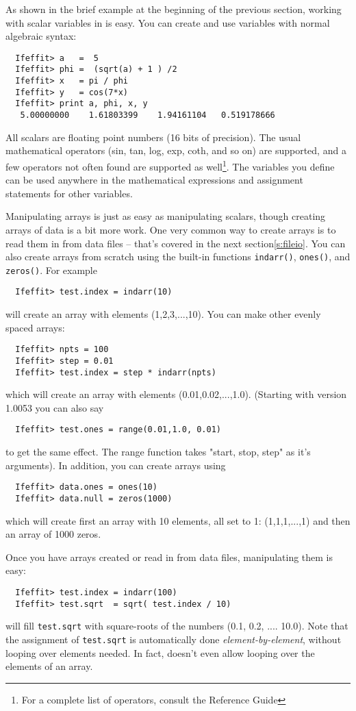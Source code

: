 \documentclass[11pt]{article}
\begin{document}
As shown in the brief example at the beginning of the previous section,
working with scalar variables in {\ifeffit} is easy.  You can create and
use variables with normal algebraic syntax:
{\small\begin{verbatim}
  Ifeffit> a   =  5
  Ifeffit> phi =  (sqrt(a) + 1 ) /2
  Ifeffit> x   = pi / phi
  Ifeffit> y   = cos(7*x)
  Ifeffit> print a, phi, x, y
   5.00000000    1.61803399    1.94161104   0.519178666      
\end{verbatim}}\noindent
All scalars are floating point numbers (16 bits of precision).  The usual
mathematical operators (sin, tan, log, exp, coth, and so on) are supported,
and a few operators not often found are supported as well{\footnote{For a
    complete list of operators, consult the Reference Guide}}. The
variables you define can be used anywhere in the mathematical expressions
and assignment statements for other variables.

Manipulating arrays is just as easy as manipulating scalars, though
creating arrays of data is a bit more work.  One very common way to create
arrays is to read them in from data files -- that's covered in the next
section\ref{s:fileio}.  You can also create arrays from scratch using the
built-in functions {\tt{indarr()}}, {\tt{ones()}}, and {\tt{zeros()}}.  For
example
{\small\begin{verbatim}
  Ifeffit> test.index = indarr(10)
\end{verbatim}}\noindent
will create an array with elements (1,2,3,...,10).   You can 
make other evenly spaced arrays:
{\small\begin{verbatim}
  Ifeffit> npts = 100
  Ifeffit> step = 0.01
  Ifeffit> test.index = step * indarr(npts)
\end{verbatim}}\noindent
which will create an array with elements (0.01,0.02,...,1.0). 
(Starting with version 1.0053 you can also say
{\small\begin{verbatim}
  Ifeffit> test.ones = range(0.01,1.0, 0.01)
\end{verbatim}}\noindent
to get the same effect.  The range function takes "start, stop, step" as
it's arguments).  In addition, you can create arrays using 
{\small\begin{verbatim}
  Ifeffit> data.ones = ones(10)
  Ifeffit> data.null = zeros(1000)
\end{verbatim}}
\noindent
which will create first an array with 10 elements, all set to 1:
(1,1,1,...,1) and then an array of 1000 zeros.

Once you have arrays created or read in from data files, manipulating them
is easy:
{\small\begin{verbatim}
  Ifeffit> test.index = indarr(100)
  Ifeffit> test.sqrt  = sqrt( test.index / 10)
\end{verbatim}}\noindent
will fill {\tt{test.sqrt}} with square-roots of the numbers (0.1, 0.2, ....
10.0).  Note that the assignment of {\tt{test.sqrt}} is automatically done
{\emph{element-by-element}}, without looping over elements needed.  In
fact, {\ifeffit} doesn't even allow looping over the elements of an array.
\end{document}
